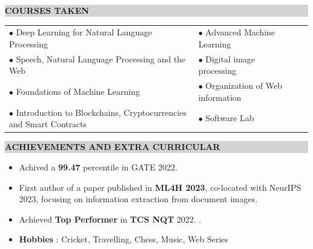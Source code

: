 \documentclass[a4paper,10.5pt]{article}
\newcommand{\resheading}[1]{{\small \colorbox{lightgray}{\begin{minipage}{0.975\textwidth}{\textbf{#1 \vphantom{p\^{E}}}}\end{minipage}}}}
\begin{document}
\vspace{0.15cm}

\resheading{\textbf{COURSES TAKEN}}
\begin{flushleft}
\vspace{-0.35cm}
\begin{tabular}{p{11.5cm}p{10cm}l}
\hspace{4.25mm} $\bullet$\hspace{0.7mm} Deep Learning for Natural Language Processing  & \qquad $\bullet$\hspace{0.7mm} Advanced Machine Learning\\

\hspace{4.25mm} $\bullet$\hspace{0.7mm} Speech, Natural Language Processing and the Web & \qquad $\bullet$\hspace{0.7mm} Digital image processing\\

\hspace{4.25mm} $\bullet$\hspace{0.7mm} Foundations of Machine Learning & \qquad $\bullet$\hspace{0.7mm} Organization of Web information \\

\hspace{4.25mm} $\bullet$\hspace{0.7mm} Introduction to Blockchains, Cryptocurrencies and Smart Contracts & \qquad $\bullet$\hspace{0.15mm} Software Lab \\
\end{tabular}
\vspace{-0.19cm}
\end{flushleft}

\resheading{\textbf{ACHIEVEMENTS AND EXTRA CURRICULAR}}
\vspace{-0.1cm}

\begin{itemize}[noitemsep,nolistsep]
    \item Achived a \textbf{99.47} percentile in GATE 2022.
    \vspace{0.05cm}
    \item First author of a paper published in \textbf{ML4H 2023}, co-located with NeurIPS 2023, focusing on information extraction from document images.
    \vspace{0.05cm}
    \item Achieved \textbf{Top Performer} in \textbf{TCS NQT} 2022. .
    \vspace{0.05cm}
    \item \textbf{Hobbies} : Cricket, Travelling, Chess, Music, Web Series
\end{itemize}
\end{document}
